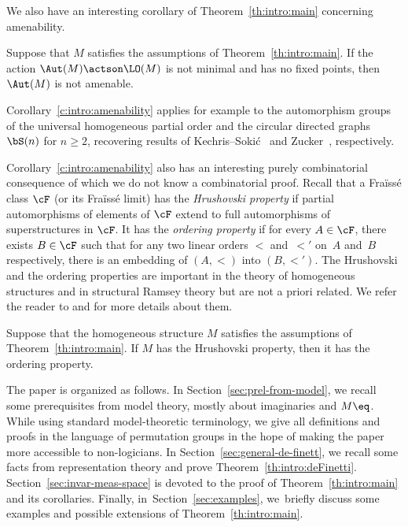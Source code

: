 We also have an interesting corollary of Theorem~\ref{th:intro:main} concerning amenability.
\begin{cor}
\label{c:intro:amenability}
Suppose that $M$ satisfies the assumptions of Theorem~\ref{th:intro:main}. If the action $\Aut(M) \actson \LO(M)$ is not minimal and has no fixed points, then $\Aut(M)$ is not amenable.
\end{cor}

Corollary~\ref{c:intro:amenability} applies for example to the automorphism groups of the universal homogeneous partial order and the circular directed graphs $\bS(n)$ for $n \geq 2$, recovering results of Kechris--Soki\'c~\cite{Kechris2012} and Zucker~\cite{Zucker2014}, respectively.

Corollary~\ref{c:intro:amenability} also has an interesting purely combinatorial consequence of which we do not know a combinatorial proof. Recall that a Fraïssé class $\cF$ (or its Fraïssé limit) has the \emph{Hrushovski property} if partial automorphisms of elements of $\cF$ extend to full automorphisms of superstructures in $\cF$. It has the \emph{ordering property} if for every $A \in \cF$, there exists $B \in \cF$ such that for any two linear orders $<$ and~$<'$ on~$A$ and~$B$ respectively, there is an embedding of $(A, <)$ into $(B, <')$. The Hrushovski and the ordering properties are important in the theory of homogeneous structures and in structural Ramsey theory but are not a priori related. We refer the reader to \cite{Kechris2007a} and \cite{Nesetril1978} for more details about them.
\begin{cor}
\label{c:intro:Hrushovski}
Suppose that the homogeneous structure $M$ satisfies the assumptions of Theorem~\ref{th:intro:main}. If $M$ has the Hrushovski property, then it has the ordering property.
\end{cor}

The paper is organized as follows. In Section~\ref{sec:prel-from-model}, we recall some prerequisites from model theory, mostly about imaginaries and $M\eq$. While using standard model-theoretic terminology, we give all definitions and proofs in the language of permutation groups in the hope of making the paper more accessible to non-logicians. In Section~\ref{sec:general-de-finett}, we recall some facts from representation theory and prove Theorem~\ref{th:intro:deFinetti}. Section~\ref{sec:invar-meas-space} is devoted to the proof of Theorem~\ref{th:intro:main} and its corollaries. Finally, in~Section~\ref{sec:examples}, we~briefly discuss some examples and possible extensions of Theorem~\ref{th:intro:main}.

